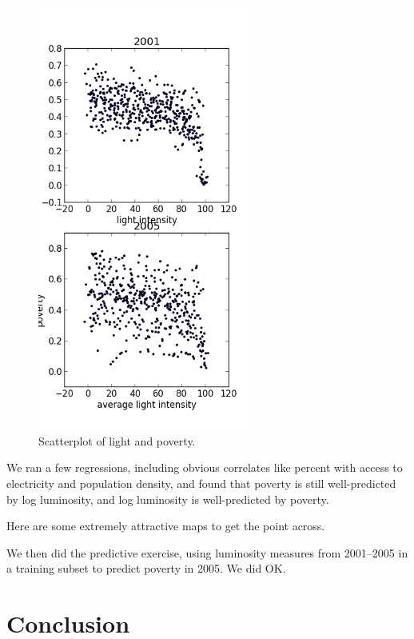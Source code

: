 \documentclass{article}
\begin{document}
\begin{figure}
\begin{center}
\includegraphics[width=7cm]{dotplot.png}

\end{center}
\caption{Scatterplot of light and poverty.}
\end{figure}

We ran a few regressions, including obvious correlates like percent with access to
electricity and population density, and found that poverty is still well-predicted by
log luminosity, and log luminosity is well-predicted by poverty.

Here are some extremely attractive maps to get the point across.

We then did the predictive exercise, using luminosity measures from 2001--2005 in a
training subset to predict poverty in 2005. We did OK.

\section{Conclusion}




\end{document}
